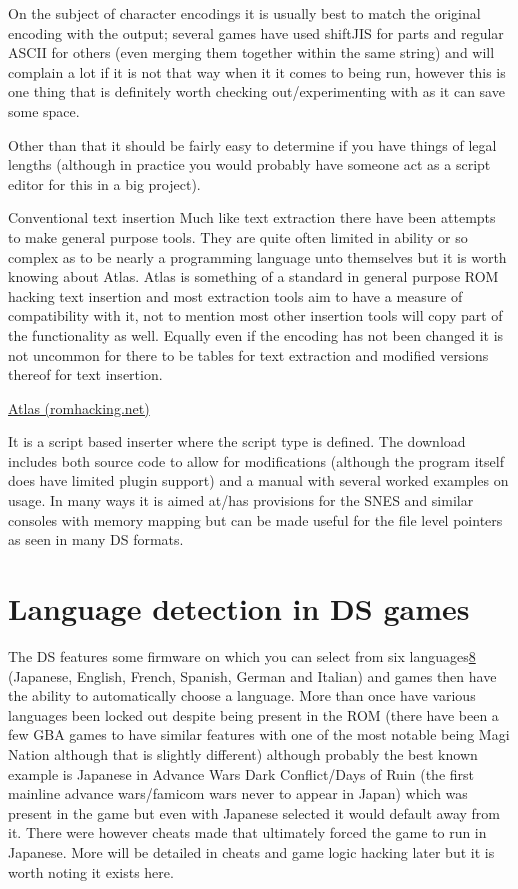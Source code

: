 \documentclass[
]{book}
\begin{document}
On the subject of character encodings it is usually best to match the original encoding with the output; several games have used shiftJIS for parts and regular ASCII for others (even merging them together within the same string) and will complain a lot if it is not that way when it it comes to being run, however this is one thing that is definitely worth checking out/experimenting with as it can save some space.

Other than that it should be fairly easy to determine if you have things of legal lengths (although in practice you would probably have someone act as a script editor for this in a big project).

Conventional text insertion Much like text extraction there have been attempts to make general purpose tools. They are quite often limited in ability or so complex as to be nearly a programming language unto themselves but it is worth knowing about Atlas. Atlas is something of a standard in general purpose ROM hacking text insertion and most extraction tools aim to have a measure of compatibility with it, not to mention most other insertion tools will copy part of the functionality as well. Equally even if the encoding has not been changed it is not uncommon for there to be tables for text extraction and modified versions thereof for text insertion.

\href{http://www.romhacking.net/reviews/62/}{Atlas (romhacking.net)}

It is a script based inserter where the script type is defined. The download includes both source code to allow for modifications (although the program itself does have limited plugin support) and a manual with several worked examples on usage. In many ways it is aimed at/has provisions for the SNES and similar consoles with memory mapping but can be made useful for the file level pointers as seen in many DS formats.

\hypertarget{language-detection-in-ds-games}{%
\section{Language detection in DS games}\label{language-detection-in-ds-games}}

The DS features some firmware on which you can select from six languages\href{romhacking20209.html\#fn8x0}{8} (Japanese, English, French, Spanish, German and Italian) and games then have the ability to automatically choose a language. More than once have various languages been locked out despite being present in the ROM (there have been a few GBA games to have similar features with one of the most notable being Magi Nation although that is slightly different) although probably the best known example is Japanese in Advance Wars Dark Conflict/Days of Ruin (the first mainline advance wars/famicom wars never to appear in Japan) which was present in the game but even with Japanese selected it would default away from it. There were however cheats made that ultimately forced the game to run in Japanese. More will be detailed in cheats and game logic hacking later but it is worth noting it exists here.
\end{document}
